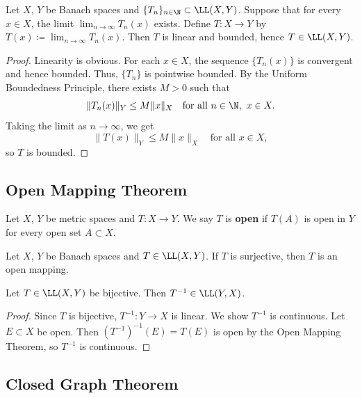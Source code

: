 \clearpage
\begin{corollary}
Let $X$, $Y$ be Banach spaces and $\{T_n\}_{n \in \N} \subset \LL(X,Y)$.  
Suppose that for every $x \in X$, the limit $\lim_{n \to \infty} T_n(x)$ exists.  
Define $T: X \to Y$ by $T(x) \coloneqq \lim_{n \to \infty} T_n(x)$.  
Then $T$ is linear and bounded, hence $T \in \LL(X,Y)$.
\end{corollary}

\begin{proof}
Linearity is obvious.  
For each $x \in X$, the sequence $\{T_n(x)\}$ is convergent and hence bounded.  
Thus, $\{T_n\}$ is pointwise bounded.  
By the Uniform Boundedness Principle, there exists $M > 0$ such that  
\[
\|T_n(x)\|_Y \leq M \|x\|_X \quad \text{for all } n \in \N,\ x \in X.
\]
Taking the limit as $n \to \infty$, we get  
\[
\|T(x)\|_Y \leq M \|x\|_X \quad \text{for all } x \in X,
\]
so $T$ is bounded.
\end{proof}

\subsection{Open Mapping Theorem}

\begin{definition}
Let $X$, $Y$ be metric spaces and $T: X \to Y$.  
We say $T$ is \textbf{open} if $T(A)$ is open in $Y$ for every open set $A \subset X$.
\end{definition}

\begin{theorem}
Let $X$, $Y$ be Banach spaces and $T \in \LL(X,Y)$.  
If $T$ is surjective, then $T$ is an open mapping.
\end{theorem}

\begin{corollary}
Let $T \in \LL(X,Y)$ be bijective.  
Then $T^{-1} \in \LL(Y,X)$.
\end{corollary}

\begin{proof}
Since $T$ is bijective, $T^{-1}: Y \to X$ is linear.  
We show $T^{-1}$ is continuous.  
Let $E \subset X$ be open. Then $(T^{-1})^{-1}(E) = T(E)$ is open by the Open Mapping Theorem,  
so $T^{-1}$ is continuous.
\end{proof}

\subsection{Closed Graph Theorem}

